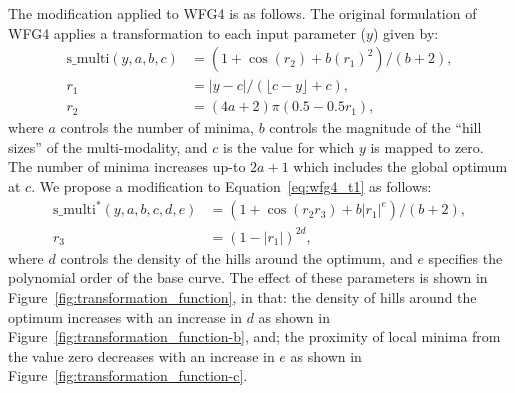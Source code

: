 \documentclass{llncs}
\begin{document}
The modification applied to WFG4 is as follows. The original formulation of WFG4 applies a transformation to each input parameter ($y$) given by:
\begin{equation}
\begin{aligned}
 \text{s\_multi}(y,a,b,c) &= \left(1+\cos(r_2) + b (r_1)^2 \right)/(b+2),\\
 r_1 &= |y-c| / (\lfloor c-y \rfloor +c ),\\
 r_2 &= (4a+2)\pi ( 0.5 - 0.5r_1 ),
 \label{eq:wfg4_t1}
\end{aligned}
 \end{equation}
where $a$ controls the number of minima, $b$ controls the magnitude of the ``hill sizes'' of the multi-modality, and $c$ is the value for which $y$ is mapped to zero. The number of minima increases up-to $2a+1$ which includes the global optimum at $c$. We propose a modification to Equation~\ref{eq:wfg4_t1} as follows:
\begin{equation}
\begin{aligned}
 \text{s\_multi}^*(y,a,b,c,d,e) &= \left( 1+\cos(r_2 r_3) +b|r_1|^e  \right)/(b+2),\\
 r_3 &= (1-|r_1|)^{2d},
\end{aligned}
 \label{eq:wfg4_t1_mod}
\end{equation}
where $d$ controls the density of the hills around the optimum, and $e$ specifies the polynomial order of the base curve. The effect of these parameters is shown in Figure~\ref{fig:transformation_function}, in that: the density of hills around the optimum increases with an increase in $d$ as shown in Figure~\ref{fig:transformation_function-b}, and; the proximity of local minima from the value zero decreases with an increase in $e$ as shown in Figure~\ref{fig:transformation_function-c}.
\end{document}
